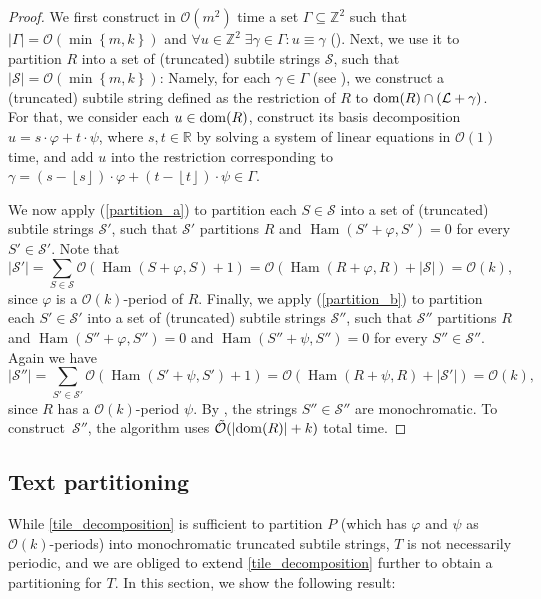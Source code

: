 \documentclass[11pt, letterpaper]{article}
\theoremstyle{plain}
\theoremstyle{definition}
\theoremstyle{remark}
\newcommand{\R}{\mathbb{R}}
\newcommand{\Z}{\mathbb{Z}}
\renewcommand{\O}{\mathcal{O}}
\newcommand{\tO}{\tilde{\mathcal{O}}}
\renewcommand{\S}{\mathcal{S}}
\renewcommand{\L}{\mathcal{L}}
\renewcommand{\phi}{\varphi}
\newcommand{\floor}[1]{\left\lfloor #1 \right\rfloor}
\newcommand{\set}[1]{\left\lbrace #1 \right\rbrace}
\DeclareMathOperator*{\Ham}{Ham}
\newcommand{\absolute}[1]{\left\lvert#1\right\rvert}
\begin{document}
\tileDecomposition
\begin{proof}
We first construct in $\O(m^2)$ time a set $\Gamma \subseteq \Z^2$ such that $\absolute{\Gamma} = \O(\min\set{m, k})$ and $\forall u \in \Z^2 \; \exists \gamma \in \Gamma : u \equiv \gamma$ (). Next, we use it to partition $R$ into a set of (truncated) subtile strings $\S$, such that $\absolute{\S} = \O(\min\set{m, k})$: Namely, for each $\gamma \in \Gamma$ (see ), we construct a (truncated) subtile string defined as the restriction of $R$ to $\d{R} \cap (\L + \gamma)$. For that, we consider each $u \in \operatorname*{dom}(R)$, construct its basis decomposition $u = s\cdot \phi + t\cdot \psi$, where $s,t\in \R$ by solving a system of linear equations in $\O(1)$ time, and add $u$ into the restriction corresponding to $\gamma = (s-\floor{s}) \cdot \phi + (t-\floor{t}) \cdot \psi \in \Gamma$. 

	We now apply  (\ref{partition_a}) to partition each $S \in \S$  into a set of (truncated) subtile strings $\S'$, such that $\S'$ partitions $R$ and $\Ham(S' + \phi, S') = 0$ for every $S' \in \S'$.
	Note that
	\[ \absolute{\S'} = \sum_{S \in \S} \O(\Ham(S + \phi, S) + 1) = \O(\Ham(R + \phi, R) + \absolute{\S}) = \O(k),\]
	since $\phi$ is a $\O(k)$-period of $R$.
	Finally, we apply   (\ref{partition_b}) to partition each $S' \in \S'$ into a set of (truncated) subtile strings $\S''$, such that $\S''$ partitions $R$ and $\Ham(S'' + \phi, S'') = 0$ and $\Ham(S'' + \psi, S'') = 0$ for every $S'' \in \S''$.
	Again we have
	\[ \absolute{\S''} = \sum_{S' \in \S'} \O(\Ham(S' + \psi, S') + 1) = \O(\Ham(R + \psi, R) + \absolute{\S'}) = \O(k),\]
	since $R$ has a $\O(k)$-period $\psi$.
	By , the strings $S'' \in \S''$ are monochromatic.
	To construct~$\S''$, the algorithm uses $\tO(\absolute{\d{R}} + k)$ total time.
\end{proof}


\subsection{Text partitioning}
While \cref{tile_decomposition} is sufficient to partition $P$ (which has $\phi$ and $\psi$ as $\O(k)$-periods) into monochromatic truncated subtile strings, $T$ is not necessarily periodic, and we are obliged to extend \cref{tile_decomposition} further to obtain a partitioning for $T$. In this section, we show the following result:
\end{document}

